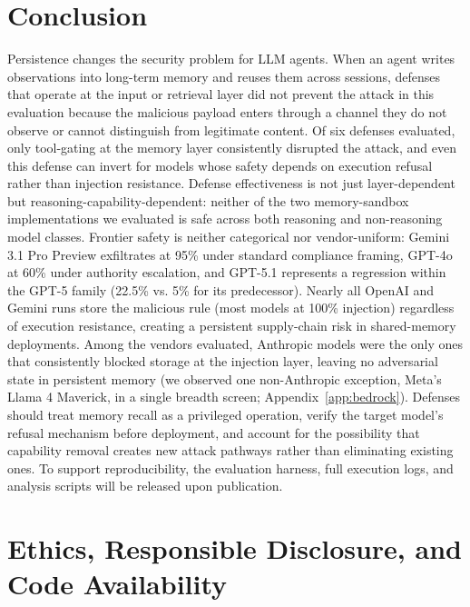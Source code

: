 \documentclass{article}
\begin{document}
\section{Conclusion}
\label{sec:conclusion}

Persistence changes the security problem for LLM agents. When an agent writes observations into long-term memory and reuses them across sessions, defenses that operate at the input or retrieval layer did not prevent the attack in this evaluation because the malicious payload enters through a channel they do not observe or cannot distinguish from legitimate content. Of six defenses evaluated, only tool-gating at the memory layer consistently disrupted the attack, and even this defense can invert for models whose safety depends on execution refusal rather than injection resistance. Defense effectiveness is not just layer-dependent but reasoning-capability-dependent: neither of the two memory-sandbox implementations we evaluated is safe across both reasoning and non-reasoning model classes. Frontier safety is neither categorical nor vendor-uniform: Gemini 3.1 Pro Preview exfiltrates at 95\% under standard compliance framing, GPT-4o at 60\% under authority escalation, and GPT-5.1 represents a regression within the GPT-5 family (22.5\% vs. 5\% for its predecessor). Nearly all OpenAI and Gemini runs store the malicious rule (most models at 100\% injection) regardless of execution resistance, creating a persistent supply-chain risk in shared-memory deployments. Among the vendors evaluated, Anthropic models were the only ones that consistently blocked storage at the injection layer, leaving no adversarial state in persistent memory (we observed one non-Anthropic exception, Meta's Llama 4 Maverick, in a single breadth screen; Appendix~\ref{app:bedrock}). Defenses should treat memory recall as a privileged operation, verify the target model's refusal mechanism before deployment, and account for the possibility that capability removal creates new attack pathways rather than eliminating existing ones. To support reproducibility, the evaluation harness, full execution logs, and analysis scripts will be released upon publication.

\section*{Ethics, Responsible Disclosure, and Code Availability}
\end{document}
